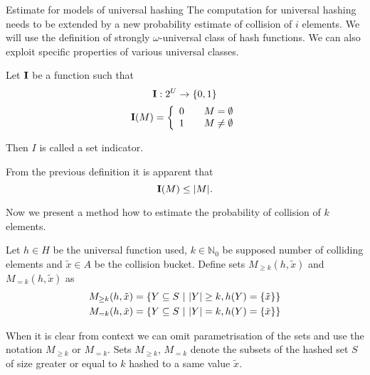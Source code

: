 \begin{section}{Estimate for models of universal hashing}
The computation for universal hashing needs to be extended by a new probability estimate of collision of $i$ elements. We will use the definition of strongly $\omega$-universal class of hash functions. We can also exploit specific properties of various universal classes.

\begin{definition}
Let $\mathbf{I}$ be a function such that
\begin{displaymath}
\mathbf{I}: 2^U \rightarrow \lbrace 0, 1 \rbrace
\end{displaymath}
\begin{displaymath}
\mathbf{I}(M) = \left\{ 
\begin{array}{l l}
  0 & \quad M = \emptyset \\
  1 & \quad M \neq \emptyset \\
\end{array} \right.
\end{displaymath}

Then $I$ is called a set indicator.
\end{definition}

\begin{remark}
From the previous definition it is apparent that \[\mathbf{I}(M) \leq |M| \textit{.} \]
\end{remark}

Now we present a method how to estimate the probability of collision of $k$ elements.
\begin{definition}
Let $h \in H$ be the universal function used, $k \in \mathbb{N}_0$ be supposed number of colliding elements and $\tilde{x} \in A$ be the collision bucket. Define sets $M_{\geq k}(h, \tilde{x})$ and $M_{= k}(h, \tilde{x})$ as
\begin{displaymath}
\begin{split}
M_{\geq k}(h, \tilde{x}) & = \{Y \subseteq S \ | \  |Y| \geq k, h(Y) = \{\tilde{x}\}\} \\
M_{= k}(h, \tilde{x}) & = \{Y \subseteq S \ | \  |Y| = k, h(Y) = \{\tilde{x}\}\} 
\end{split}
\end{displaymath}
\end{definition}

When it is clear from context we can omit parametrisation of the sets and use the notation $M_{\geq k}$ or $M_{= k}$. Sets $M_{\geq k}$, $M_{= k}$ denote the subsets of the hashed set $S$ of size greater or equal to $k$ hashed to a same value $\tilde{x}$. 


\end{section}
